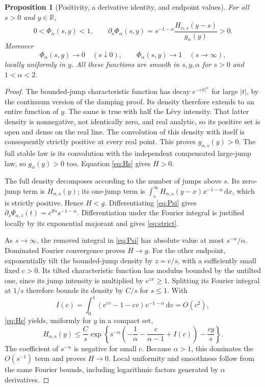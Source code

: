 \documentclass[11pt,a4paper]{article}
\numberwithin{equation}{section}
\newtheorem{proposition}[theorem]{Proposition}
\theoremstyle{definition}\newtheorem{definition}[theorem]{Definition}
\theoremstyle{remark}\newtheorem{remark}[theorem]{Remark}
\theoremstyle{definition}
\newcommand{\R}{\mathbb R}\newcommand{\C}{\mathbb C}
\newcommand{\dd}{\,\mathrm d}
\begin{document}
\begin{proposition}[Positivity, a derivative identity, and endpoint values]
\label{prop:profile}
For all $s>0$ and $y\in\R$,
\begin{equation}\label{eq:strict}
 0<\Phi_\alpha(s,y)<1,
 \qquad
 \partial_s\Phi_\alpha(s,y)
 =s^{-1-\alpha}\frac{H_{\alpha,s}(y-s)}{g_\alpha(y)}>0.
\end{equation}
Moreover
\begin{equation}\label{eq:ends}
 \Phi_\alpha(s,y)\to0\quad(s\downarrow0),\qquad
 \Phi_\alpha(s,y)\to1\quad(s\to\infty),
\end{equation}
locally uniformly in $y$. All these functions are smooth in $s,y,\alpha$
for $s>0$ and $1<\alpha<2$.
\end{proposition}
\begin{proof}
The bounded-jump characteristic function has decay $e^{-c|t|^\alpha}$
for large $|t|$, by the continuum version of the damping proof. Its density
therefore extends to an entire function of $y$. The same is true with half
the L\'evy intensity. That latter density is nonnegative, not identically
zero, and real analytic, so its positive set is open and dense on the real
line. The convolution of this density with itself is consequently strictly
positive at every real point. This proves $g_{\alpha,s}(y)>0$. The full
stable law is its convolution with the independent compensated large-jump
law, so $g_\alpha(y)>0$ too. Equation \eqref{eq:Hs} gives $H>0$.

The full density decomposes according to the number of jumps above $s$.
Its zero-jump term is $H_{\alpha,s}(y)$; its one-jump term is
$\int_s^\infty H_{\alpha,s}(y-x)x^{-1-\alpha}\dd x$, which is strictly
positive. Hence $H<g$. Differentiating \eqref{eq:Psi} gives
$\partial_s\Psi_{\alpha,s}(t)=e^{\ii ts}s^{-1-\alpha}$. Differentiation
under the Fourier integral is justified locally by its exponential
majorant and gives \eqref{eq:strict}.

As $s\to\infty$, the removed integral in \eqref{eq:Psi} has absolute value
at most $s^{-\alpha}/\alpha$. Dominated Fourier convergence proves $H\to g$.
For the other endpoint, exponentially tilt the bounded-jump density by
$z=c/s$, with a sufficiently small fixed $c>0$. Its tilted characteristic
function has modulus bounded by the untilted one, since its jump intensity
is multiplied by $e^{zx}\ge1$. Splitting its Fourier integral at $1/s$
therefore bounds its density by $C/s$ for $s\le1$. With
\[
 I(c)=\int_0^1(e^{cv}-1-cv)v^{-1-\alpha}\dd v=O(c^2),
\]
\eqref{eq:Hs} yields, uniformly for $y$ in a compact set,
\[
 H_{\alpha,s}(y)\le\frac Cs
 \exp\left\{s^{-\alpha}\left(-\frac1\alpha-\frac c{\alpha-1}+I(c)\right)
                 -\frac{cy}s\right\}.
\]
The coefficient of $s^{-\alpha}$ is negative for small $c$. Because
$\alpha>1$, this dominates the $O(s^{-1})$ term and proves $H\to0$.
Local uniformity and smoothness follow from the same Fourier bounds,
including logarithmic factors generated by $\alpha$ derivatives.
\end{proof}
\end{document}
